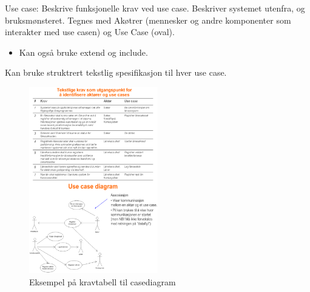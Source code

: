 \documentclass[11pt]{article}
\begin{document}
    Use case: Beskrive funksjonelle krav ved use case. Beskriver systemet utenfra, og bruksmønsteret. 
    Tegnes med Akøtrer (mennesker og andre komponenter som interakter med use casen) og Use Case (oval).
\begin{itemize}
\item Kan også bruke \label{extend}extend og \label{include}include.
\end{itemize}
    Kan bruke struktrert tekstlig spesifikasjon til hver use case.

    \begin{figure}[htb]
    \centering
    \includegraphics[width=0.5\textwidth]{./kravogcase.eps}
    \caption{\label{fig:kravogcase}Eksempel på kravtabell til casediagram}
    \end{figure}
\end{document}
